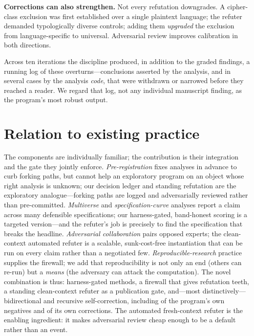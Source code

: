 \documentclass[11pt]{article}
\begin{document}
\textbf{Corrections can also strengthen.} Not every refutation downgrades. A cipher-class
exclusion was first established over a single plaintext language; the refuter demanded
typologically diverse controls; adding them \emph{upgraded} the exclusion from
language-specific to universal. Adversarial review improves calibration in both directions.

Across ten iterations the discipline produced, in addition to the graded findings, a running
log of these overturns---conclusions asserted by the analysis, and in several cases by the
analysis \emph{code}, that were withdrawn or narrowed before they reached a reader. We regard
that log, not any individual manuscript finding, as the program's most robust output.

\section{Relation to existing practice}
The components are individually familiar; the contribution is their integration and the gate
they jointly enforce. \emph{Pre-registration} \citep{nosek2018preregistration} fixes analyses
in advance to curb forking paths, but cannot help an exploratory program on an object whose
right analysis is unknown; our decision ledger and standing refutation are the exploratory
analogue---forking paths are logged and adversarially reviewed rather than pre-committed.
\emph{Multiverse} \citep{steegen2016multiverse} and \emph{specification-curve}
\citep{simonsohn2020specification} analyses report a claim across many defensible
specifications; our harness-gated, band-honest scoring is a targeted version---and the
refuter's job is precisely to find the specification that breaks the headline.
\emph{Adversarial collaboration} \citep{mellers2001adversarial} pairs opposed experts; the
clean-context automated refuter is a scalable, sunk-cost-free instantiation that can be run on
every claim rather than a negotiated few. \emph{Reproducible-research} practice
\citep{sandve2013ten} supplies the firewall; we add that reproducibility is not only an end
(others can re-run) but a \emph{means} (the adversary can attack the computation). The novel
combination is thus: harness-gated methods, a firewall that gives refutation teeth, a standing
clean-context refuter as a publication gate, and---most distinctively---bidirectional and
recursive self-correction, including of the program's own negatives and of its own
corrections. The automated fresh-context refuter is the enabling ingredient: it makes
adversarial review cheap enough to be a default rather than an event.
\end{document}
